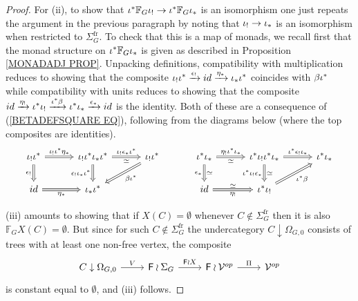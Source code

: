 \documentclass[a4paper,10pt]{article}%
\begin{document}
\begin{proof}
  For (ii), to show that 
  $\iota^{\**} \mathbb{F}_G \iota_{!}
  \to	
  \iota^{\**} \mathbb{F}_G \iota_{\**}$ is an isomorphism one just repeats the argument in the previous paragraph by noting  that $\iota_! \to \iota_{\**}$ is an isomorphism when restricted to $\Sigma_G^{\text{fr}}$.
  To check that this is a map of monads, we recall first that the monad structure on $\iota^{\**} \mathbb{F}_G \iota_{\**}$
  is given as described in Proposition \ref{MONADADJ PROP}.
  Unpacking definitions, compatibility with multiplication reduces to showing that the composite 
  $\iota_! \iota^{\**} \xrightarrow{\epsilon_!} 
  id \xrightarrow{\eta_{\**}} \iota_{\**} \iota^{\**}$
  coincides with $\beta \iota^{\**}$
  while compatibility with units 
  reduces to showing that the composite
  $
  id \xrightarrow{\eta_!} 
  \iota^{\**} \iota_! \xrightarrow{\iota^{\**} \beta}
  \iota^{\**} \iota_{\**} \xrightarrow{\epsilon_{\**}}
  id
  $
  is the identity. Both of these are a consequence of 
  (\ref{BETADEFSQUARE EQ}), following from the diagrams below 
  (where the top composites are identities).
  \begin{equation}
    \begin{tikzcd}[column sep =3em]
      \iota_! \iota^{\**}
      \ar[Rightarrow]{r}{\iota_! \iota^{\**} \eta_{\**}}
      \ar[Rightarrow]{d}[swap]{\epsilon_!}
      &
      \iota_{!} \iota^{\**} \iota_{\**} \iota^{\**}
      \ar[Rightarrow]{d}[swap]{ \epsilon_! \iota_{\**}\iota^{\**}}
      \ar[Rightarrow]{r}[swap]{\simeq}{\iota_{!}\epsilon_{\**}\iota^{\**}}
      &
      \iota_! \iota^{\**}
      \ar[Rightarrow]{ld}{\beta \iota^{\**}}
      &	
      \iota^{\**} \iota_{\**}
      \ar[Rightarrow]{r}{\eta_! \iota^{\**} \iota_{\**}}[swap]{\simeq}
      \ar[Rightarrow]{d}[swap]{\epsilon_{\**}}{\simeq}
      &
      \iota^{\**} \iota_{!} \iota^{\**} \iota_{\**}
      \ar[Rightarrow]{r}{\iota^{\**} \epsilon_! \iota_{\**}}
      \ar[Rightarrow]{d}{\simeq}[swap]{\iota^{\**}\iota_{!}\epsilon_{\**}}
      &
      \iota^{\**}\iota_{\**}
      \\
      id
      \ar[Rightarrow]{r}[swap]{\eta_{\**}}
      &
      \iota_{\**} \iota^{\**}
      &
      &	
      id
      \ar[Rightarrow]{r}[swap]{\eta_!}{\simeq}
      &
      \iota^{\**} \iota_!
      \ar[Rightarrow]{ru}[swap]{\iota^{\**} \beta}
    \end{tikzcd}
  \end{equation}

  (iii) amounts to showing that if $X(C) =\emptyset$ whenever 
  $C \nin \Sigma_G^{\text{fr}}$
  then it is also 
  $\mathbb{F}_G X(C) =\emptyset$.
  But since for such 
  $C \nin \Sigma_G^{\text{fr}}$
  the undercategory
  $C \downarrow \Omega_{G,0}$
  consists of trees with at least one non-free vertex, the composite
  \[
  \begin{tikzcd}
    C \downarrow \Omega_{G,0} \ar{r}{V} &
    \Fin \wr \Sigma_G \ar{r}{\Fin \wr X} &
    \Fin \wr \mathcal{V}^{op} \ar{r}{\Pi}&
    \mathcal{V}^{op}
  \end{tikzcd}
  \]
  is constant equal to $\emptyset$, and (iii) follows.



\end{proof}
\end{document}
